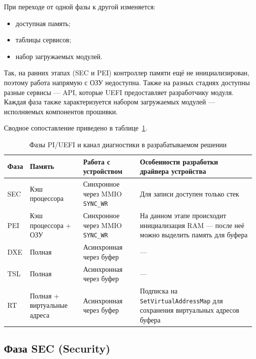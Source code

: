 При переходе от одной фазы к другой изменяется:
\begin{itemize}
    \item доступная память;
    \item таблицы сервисов;
    \item набор загружаемых модулей.
\end{itemize}

Так, на ранних этапах (SEC и PEI) контроллер памяти ещё не инициализирован, поэтому работа напрямую с ОЗУ недоступна. Также на разных стадиях доступны разные сервисы --- API, которые UEFI предоставляет разработчику модуля. Каждая фаза также характеризуется набором загружаемых модулей --- исполняемых компонентов прошивки.

Сводное сопоставление приведено в таблице~\ref{tab:uefi-phases-detailed}.

\begin{table}[ht]
    \centering
    \caption{Фазы PI/UEFI и канал диагностики в разрабатываемом решении}
    \label{tab:uefi-phases-detailed}
    \small
    \setlength{\tabcolsep}{4pt}
    \renewcommand{\arraystretch}{1.15}
    \begin{tabularx}{\textwidth}{|>{\raggedright\arraybackslash}p{0.9cm}|>{\raggedright\arraybackslash}p{2.1cm}|>{\raggedright\arraybackslash}X|>{\raggedright\arraybackslash}X|}
        \hline
        Фаза & Память & Работа с устройством & Особенности разработки драйвера устройства \\
        \hline
        SEC & Кэш процессора & Синхронное через MMIO \texttt{SYNC\_WR} &
        Для записи доступен только стек \\
        \hline
        PEI & Кэш процессора + ОЗУ & Синхронное через MMIO \texttt{SYNC\_WR} &
        На данном этапе происходит инициализация RAM --- после неё можно выделить память для буфера \\
        \hline
        DXE & Полная &
        Асинхронная через буфер &
        --- \\
        \hline
        TSL & Полная & Асинхронная через буфер &
        --- \\
        \hline
        RT & Полная + виртуальные адреса &
        Асинхронная через буфер &
        Подписка на \texttt{SetVirtualAddressMap} для сохранения виртуальных адресов буфера \\
        \hline
    \end{tabularx}
\end{table}

\subsection{Фаза SEC (Security)}

